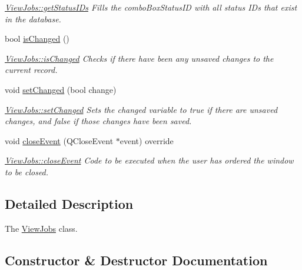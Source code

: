 \begin{DoxyCompactItemize}
\begin{DoxyCompactList}\small\item\em \hyperlink{class_view_jobs_adabe196e81c74d17c436de1a6ea12099}{View\+Jobs\+::get\+Status\+I\+Ds} Fills the combo\+Box\+Status\+ID with all status I\+Ds that exist in the database. \end{DoxyCompactList}\item 
bool \hyperlink{class_view_jobs_a5f75b45d28ce7f4a8050ce9ce0f44350}{is\+Changed} ()
\begin{DoxyCompactList}\small\item\em \hyperlink{class_view_jobs_a5f75b45d28ce7f4a8050ce9ce0f44350}{View\+Jobs\+::is\+Changed} Checks if there have been any unsaved changes to the current record. \end{DoxyCompactList}\item 
void \hyperlink{class_view_jobs_a3cba868c6deadaf4b35c18982f7ec35e}{set\+Changed} (bool change)
\begin{DoxyCompactList}\small\item\em \hyperlink{class_view_jobs_a3cba868c6deadaf4b35c18982f7ec35e}{View\+Jobs\+::set\+Changed} Sets the changed variable to true if there are unsaved changes, and false if those changes have been saved. \end{DoxyCompactList}\item 
void \hyperlink{class_view_jobs_a832503ca9eb4e4bf79c2fb48a59141aa}{close\+Event} (Q\+Close\+Event $\ast$event) override
\begin{DoxyCompactList}\small\item\em \hyperlink{class_view_jobs_a832503ca9eb4e4bf79c2fb48a59141aa}{View\+Jobs\+::close\+Event} Code to be executed when the user has ordered the window to be closed. \end{DoxyCompactList}\end{DoxyCompactItemize}


\subsection{Detailed Description}
The \hyperlink{class_view_jobs}{View\+Jobs} class. 

\subsection{Constructor \& Destructor Documentation}
\mbox{\label{class_view_jobs_a25c5a4f3fa92331821579b60d47185fc}} 
